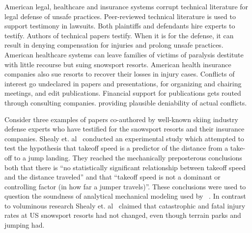 \documentclass[smallextended]{svjour3}       %
\begin{document}

American legal, healthcare and insurance systems corrupt technical literature
for legal defense of unsafe practices. Peer-reviewed technical literature is
used to support testimony in lawsuits. Both plaintiffs and defendants hire
experts to testify. Authors of technical papers testify. When it is for the
defense, it can result in denying compensation for injuries and prolong unsafe
practices. American healthcare systems can leave families of victims of
paralysis destitute with little recourse but suing snowsport resorts.  American
health insurance companies also sue resorts to recover their losses in injury
cases. Conflicts of interest go undeclared in papers and presentations, for
organizing and chairing meetings, and edit publications. Financial support for
publications gets routed through consulting companies. providing plausible
deniability of actual conflicts.


Consider three examples of papers co-authored by well-known skiing industry
defense experts who have testified for the snowsport resorts and their
insurance companies. Shealy et. al~\cite{Shealy2010} conducted an experimental
study which attempted to test the hypothesis that takeoff speed is a predictor
of the distance from a take-off to a jump landing. They reached the
mechanically preposterous conclusions both that there is ``no statistically
significant relationship between takeoff speed and the distance traveled'' and
that ``takeoff speed is not a dominant or controlling factor (in how far a
jumper travels)''. These conclusions were used to question the soundness of
analytical mechanical modeling used by ~\cite{Hubbard2009,McNeil2012}. In
contrast to voluminous research Shealy et. al~\cite{Shealy2015} claimed that
catastrophic and fatal injury rates at US snowsport resorts had not changed,
even though terrain parks and jumping had.

\end{document}
